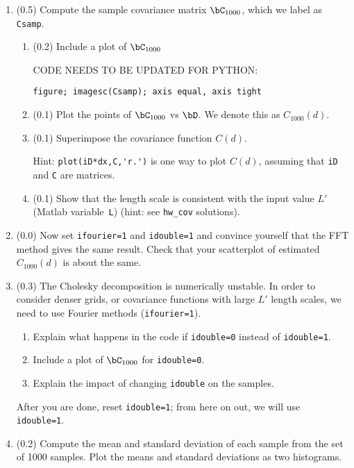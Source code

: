 \documentclass[11pt,titlepage,fleqn]{article}
\begin{document}
\begin{enumerate}
\item (0.5) Compute the sample covariance matrix $\bC_{1000}$, which we label as \verb+Csamp+.

\begin{enumerate}
\item (0.2) Include a plot of $\bC_{1000}$

CODE NEEDS TO BE UPDATED FOR PYTHON:

\verb+figure; imagesc(Csamp); axis equal, axis tight+

\item (0.1) Plot the points of $\bC_{1000}$ vs $\bD$. We denote this as $C_{1000}(d)$.


\item (0.1) Superimpose the covariance function $C(d)$.

Hint: \verb+plot(iD*dx,C,'r.')+ is one way to plot $C(d)$, assuming that \verb+iD+ and \verb+C+ are matrices.

\item (0.1) Show that the length scale is consistent with the input value $L'$ (Matlab variable~\verb+L+) (hint: see \verb+hw_cov+ solutions).
\end{enumerate}

\item (0.0) Now set \verb+ifourier=1+ and \verb+idouble=1+ and convince yourself that the FFT method gives the same result. Check that your scatterplot of estimated $C_{1000}(d)$ is about the same.

\item (0.3) The Cholesky decomposition is numerically unstable. In order to consider denser grids, or covariance functions with large $L'$ length scales, we need to use Fourier methods (\verb+ifourier=1+).

\begin{enumerate}
\item Explain what happens in the code if \verb+idouble=0+ instead of \verb+idouble=1+.
\item Include a plot of $\bC_{1000}$ for \verb+idouble=0+.
\item Explain the impact of changing \verb+idouble+ on the samples.
\end{enumerate}
%
After you are done, reset \verb+idouble=1+; from here on out, we will use \verb+idouble=1+.

\item (0.2) Compute the mean and standard deviation of each sample from the set of 1000 samples. Plot the means and standard deviations as two histograms.


\end{enumerate}
\end{document}
